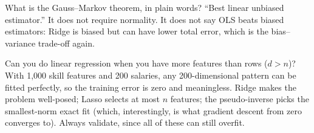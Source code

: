 \begin{qa}{What is the Gauss--Markov theorem, in plain words?}
\why ``Best linear unbiased estimator.'' It does not require normality. It does not say OLS beats biased estimators:
Ridge is biased but can have lower total error, which is the bias--variance trade-off again.
\end{qa}

\begin{qa}{\deep Can you do linear regression when you have more features than rows ($d > n$)?}
\why With 1{,}000 skill features and 200 salaries, any 200-dimensional pattern can be fitted perfectly, so the
training error is zero and meaningless. Ridge makes the problem well-posed; Lasso selects at most $n$ features;
the pseudo-inverse picks the smallest-norm exact fit (which, interestingly, is what gradient descent from zero
converges to). Always validate, since all of these can still overfit.
\end{qa}
